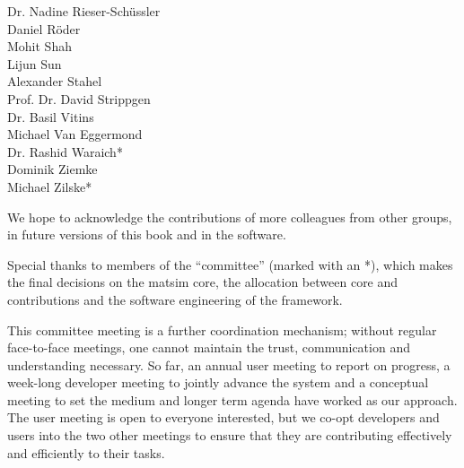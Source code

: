 \begin{multicols}{3}
Dr. Nadine Rieser-Schüssler \\
Daniel Röder \\
Mohit Shah \\
Lijun Sun \\
Alexander Stahel \\
Prof. Dr. David Strippgen \\
Dr. Basil Vitins \\
Michael Van Eggermond \\
Dr. Rashid Waraich\mbox{*} \\
Dominik Ziemke \\
Michael Zilske\mbox{*} \\
\end{multicols}
% 
We hope to acknowledge the contributions of more colleagues from other groups, in future versions of this book and in the software.   

Special thanks to members of the ``committee'' (marked with an \mbox{*}), which makes the final decisions on the \gls{matsim} core, the allocation between core and \glspl{contribution} and the software engineering of the \gls{framework}.

This committee meeting is a further coordination mechanism; without regular face-to-face meetings, one cannot maintain the trust, communication and understanding necessary. So far, an annual user meeting to report on progress, a week-long developer meeting to jointly advance the system and a conceptual meeting to set the medium and longer term agenda have worked as our approach. The user meeting is open to everyone interested, but we co-opt developers and users into the two other meetings to ensure that they are contributing effectively and efficiently to their tasks. 


